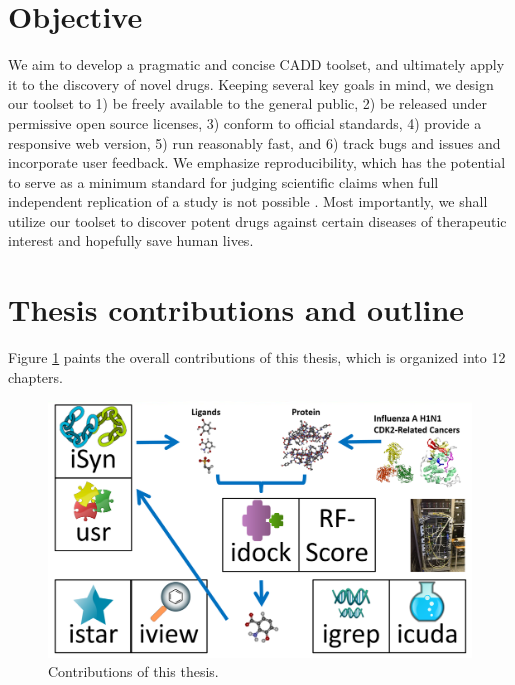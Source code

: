 \section{Objective}

We aim to develop a pragmatic and concise CADD toolset, and ultimately apply it to the discovery of novel drugs. Keeping several key goals in mind, we design our toolset to 1) be freely available to the general public, 2) be released under permissive open source licenses, 3) conform to official standards, 4) provide a responsive web version, 5) run reasonably fast, and 6) track bugs and issues and incorporate user feedback. We emphasize reproducibility, which has the potential to serve as a minimum standard for judging scientific claims when full independent replication of a study is not possible \citep{965}. Most importantly, we shall utilize our toolset to discover potent drugs against certain diseases of therapeutic interest and hopefully save human lives.

\section{Thesis contributions and outline}

Figure \ref{thesis:contributions} paints the overall contributions of this thesis, which is organized into 12 chapters.

\begin{figure}
\begin{center}
\includegraphics[width=\linewidth]{Contributions.png}
\end{center}
\caption{Contributions of this thesis.}
\label{thesis:contributions}
\end{figure}


